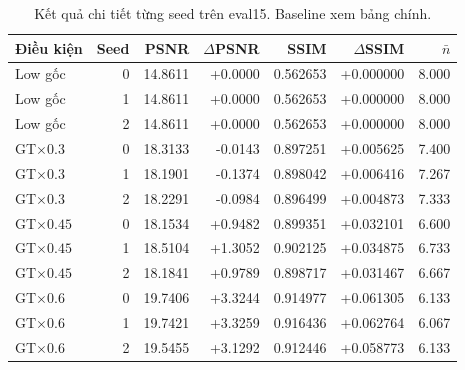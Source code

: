 \begin{table}[H]\centering\small
\caption{Kết quả chi tiết từng seed trên eval15. Baseline xem bảng chính.}
\begin{tabular}{lrrrrrr}\toprule
Điều kiện & Seed & PSNR & $\Delta$PSNR & SSIM & $\Delta$SSIM & $\bar n$\\\midrule
Low gốc & 0 & 14.8611 & +0.0000 & 0.562653 & +0.000000 & 8.000\\
Low gốc & 1 & 14.8611 & +0.0000 & 0.562653 & +0.000000 & 8.000\\
Low gốc & 2 & 14.8611 & +0.0000 & 0.562653 & +0.000000 & 8.000\\
GT$\times0.3$ & 0 & 18.3133 & -0.0143 & 0.897251 & +0.005625 & 7.400\\
GT$\times0.3$ & 1 & 18.1901 & -0.1374 & 0.898042 & +0.006416 & 7.267\\
GT$\times0.3$ & 2 & 18.2291 & -0.0984 & 0.896499 & +0.004873 & 7.333\\
GT$\times0.45$ & 0 & 18.1534 & +0.9482 & 0.899351 & +0.032101 & 6.600\\
GT$\times0.45$ & 1 & 18.5104 & +1.3052 & 0.902125 & +0.034875 & 6.733\\
GT$\times0.45$ & 2 & 18.1841 & +0.9789 & 0.898717 & +0.031467 & 6.667\\
GT$\times0.6$ & 0 & 19.7406 & +3.3244 & 0.914977 & +0.061305 & 6.133\\
GT$\times0.6$ & 1 & 19.7421 & +3.3259 & 0.916436 & +0.062764 & 6.067\\
GT$\times0.6$ & 2 & 19.5455 & +3.1292 & 0.912446 & +0.058773 & 6.133\\
\bottomrule\end{tabular}
\end{table}
